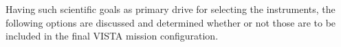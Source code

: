 








Having such scientific goals as primary drive for selecting the instruments, the following options are discussed and determined whether or not those are to be included in the final VISTA mission configuration.   

